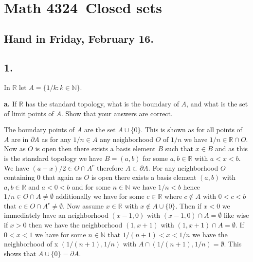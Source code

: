 \documentclass{amsart}
\theoremstyle{plain}
\theoremstyle{definition}
\theoremstyle{remark}
\begin{document}
\section*{Math 4324\  Closed sets } 

\subsection*{Hand in Friday, February 16.} 




\vspace{.15in}
\noindent
\subsection*{1.} In $\mathbb R$ let $A = \{ 1/k : k\in \mathbb N \}$.

\vspace{.1in}
{\bfseries a.} If $\mathbb R$ has the standard topology, what is the boundary of $A$, and what is the set of limit points of $A$. Show that your answers are correct. 
    
The boundary points of $A$ are the set $A\cup \{0\}$. This is shown as for all points of $A$ are in $\partial A$ as for any $1/n\in A$ any neighborhood $O$ of $1/n$ we have $1/n\in \mathbb{R}\cap O$. Now as $O$ is open then there exists a basis element $B$ such that $x\in B$ and as this is the standard topology we have $B=(a,b)$ for some $a,b\in \mathbb{R}$ with $a<x<b$. We have  $(a+x)/2 \in O \cap A^c $ therefore $A\subset \partial A$. For any neighborhood $O$ containing $0$ that again as $O$ is open there exists a basis element $(a,b)$ with $a,b\in \mathbb{R}$ and $a<0<b$ and for some $n\in \mathbb{N}$ we have $1/n<b$ hence $1/n\in O\cap A\not = \emptyset$ additionally we have for some $c\in \mathbb{R}$ where $c\not \in A$ with $0<c<b$ that $c\in O\cap A^c\not = \emptyset$. Now assume $x\in \mathbb{R}$ with $x\not \in A\cup \{0\}$. Then if $x<0$ we immediately have an neighborhood $(x-1,0)$ with $(x-1,0)\cap A=\emptyset$ like wise if $x>0$ then we have the neighborhood $(1,x+1) $ with $(1,x+1)\cap A=\emptyset$. If $0<x<1$ we have for some $n\in \mathbb{N}$ that $1/(n+1)<x<1/n$ we have the neighborhood of x $(1/(n+1),1/n)$ with $A\cap (1/(n+1),1/n)=\emptyset$. This shows that $A\cup \{0\}=\partial A$.
\end{document}
